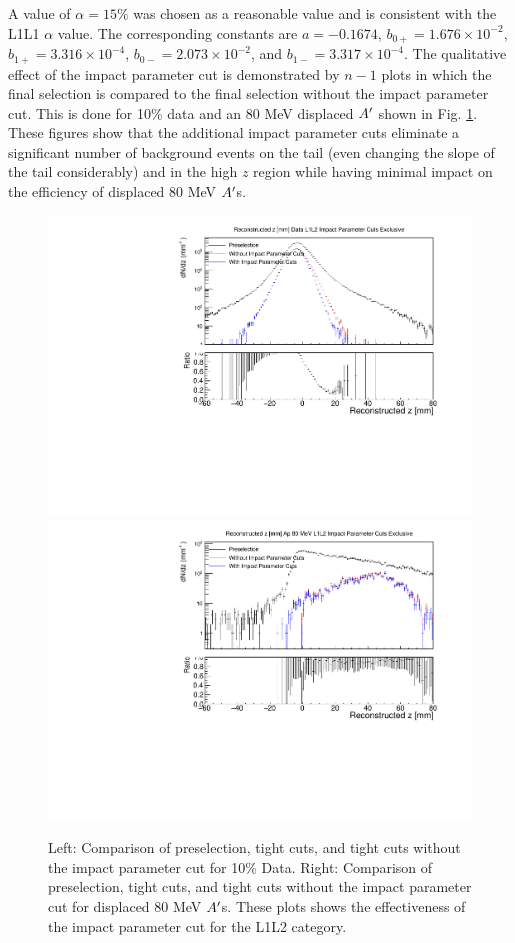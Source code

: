 A value of $\alpha=15\%$ was chosen as a reasonable value and is consistent with the L1L1 $\alpha$ value. The corresponding constants are $a=-0.1674$, $b_{0+}=1.676 \times 10^{-2}$,  $b_{1+}=3.316 \times 10^{-4}$,  $b_{0-}=2.073 \times 10^{-2}$,  and $b_{1-}=3.317 \times 10^{-4}$. The qualitative effect of the impact parameter cut is demonstrated by $n-1$ plots in which the final selection is compared to the final selection without the impact parameter cut. This is done for 10\% data and an 80 MeV displaced $A^\prime$ shown in Fig. \ref{fig:ip_L1L2}. These figures show that the additional impact parameter cuts eliminate a significant number of background events on the tail (even changing the slope of the tail considerably) and in the high $z$ region while having minimal impact on the efficiency of displaced 80 MeV $A^\prime$s. %


\begin{figure}[!ht] 
    \centering
    \includegraphics[width=.45\textwidth]{figs/selection/ip_n_1_z_L1L2.pdf}
    \includegraphics[width=.45\textwidth]{figs/selection/ap_80MeV_ip_n_1_z_L1L2.pdf}
    \caption{
        Left: Comparison of preselection, tight cuts, and tight cuts without the impact parameter cut for 10\% Data. Right: Comparison of preselection, tight cuts, and tight cuts without the impact parameter cut for displaced 80 MeV $A^\prime$s. These plots shows the effectiveness of the impact parameter cut for the L1L2 category.
    }
    \label{fig:ip_L1L2}
\end{figure}  

